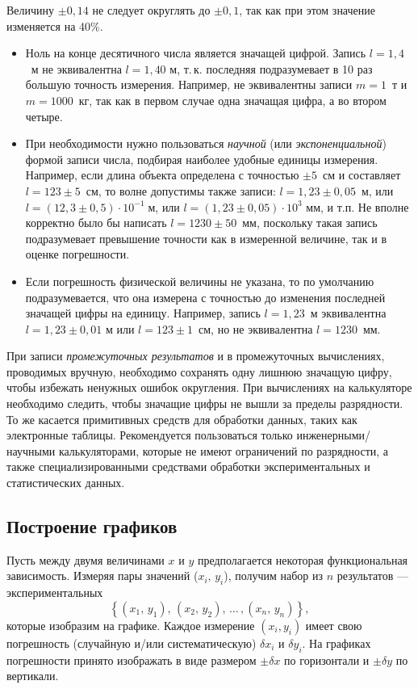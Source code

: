 \medskip

Величину $\pm0{,}14$ не следует округлять до $\pm0{,}1$, так как
при этом значение изменяется на 40\%.
\begin{itemize}
\item Ноль на конце десятичного числа является значащей цифрой. Запись
$l=1{,}4$~м
не эквивалентна $l=1{,}40$ м, т.\,к. последняя подразумевает в 10
раз большую точность измерения. Например, не эквивалентны записи $m=1$~т
и $m=1000$~кг, так как в первом случае одна значащая цифра, а во
втором четыре.
\item При необходимости нужно пользоваться\emph{ научной} (или
\emph{экспоненциальной})
формой записи числа, подбирая наиболее удобные единицы измерения.
Например, если длина объекта определена с точностью $\pm5$~см и
составляет $l=123\pm5$~см, то волне допустимы также записи:
$l=1{,}23\pm0{,}05$~м,
или $l=\left(12{,}3\pm0{,}5\right)\cdot10^{-1}\;\text{м}$, или
$l=\left(1{,}23\pm0{,}05\right)\cdot10^{3}\text{ мм}$,
и т.п. Не вполне корректно было бы написать $l=1230\pm50$~мм, поскольку
такая запись подразумевает превышение точности как в измеренной величине,
так и в оценке погрешности.
\item Если погрешность физической величины не указана, то по умолчанию
подразумевается,
что она измерена с точностью до изменения последней значащей цифры
на единицу. Например, запись $l=1{,}23$~м эквивалентна $l=1{,}23\pm0{,}01$
м или $l=123\pm1$~см, но не эквивалентна $l=1230$~мм.
\end{itemize}
При записи \emph{промежуточных результатов} и в промежуточных вычислениях,
проводимых вручную, необходимо сохранять одну лишнюю значащую цифру,
чтобы избежать ненужных ошибок округления. При вычислениях на калькуляторе
необходимо следить, чтобы значащие цифры не вышли за пределы разрядности.
То же касается примитивных средств для обработки данных, таких как
электронные таблицы. Рекомендуется пользоваться только инженерными/научными
калькуляторами, которые не имеют ограничений по разрядности, а также
специализированными средствами обработки экспериментальных и статистических
данных.

\subsection{Построение графиков}

Пусть между двумя величинами $x$ и $y$ предполагается некоторая
функциональная зависимость. Измеряя пары значений ($x_{i},\,y_{i}$),
получим набор из $n$ результатов --- экспериментальных 
\[
\left\{ (x_{1},\,y_{1}),\,(x_{2},\,y_{2}),\,\ldots\,,(x_{n},\,y_{n})\right\},
\]
которые изобразим на графике. Каждое измерение $\left(x_{i},y_{i}\right)$
имеет свою погрешность (случайную и/или систематическую)
$\delta x_i$ и $\delta y_i$. На графиках погрешности принято изображать в виде  размером $\pm\delta x$ по горизонтали и 
$\pm\delta y$ по вертикали.

